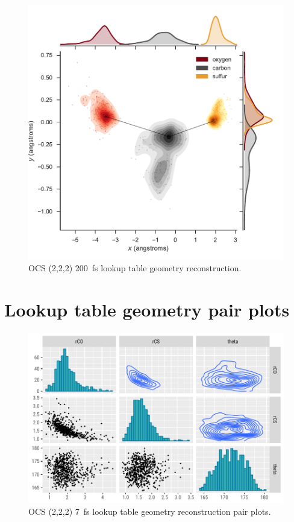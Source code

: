 \begin{figure}
  \centering
  \includegraphics[width=\textwidth]{Plots/OCS222200fsLTGeometry}
  \caption[OCS (2,2,2) \SI{200}{\fs} lookup table geometry reconstruction.]
  {OCS (2,2,2) \SI{200}{\fs} lookup table geometry reconstruction.}
  \label{fig:OCS222200fsLTGeometry}
\end{figure}

\section{Lookup table geometry pair plots}

\begin{figure}
  \centering
  \includegraphics[width=\textwidth]{Plots/OCS2227fsLTGeometryPairPlots}
  \caption[OCS (2,2,2) \SI{7}{\fs} lookup table geometry reconstruction pair plots.]
  {OCS (2,2,2) \SI{7}{\fs} lookup table geometry reconstruction pair plots.}
  \label{fig:OCS2227fsLTGeometryPairPlots}
\end{figure}

